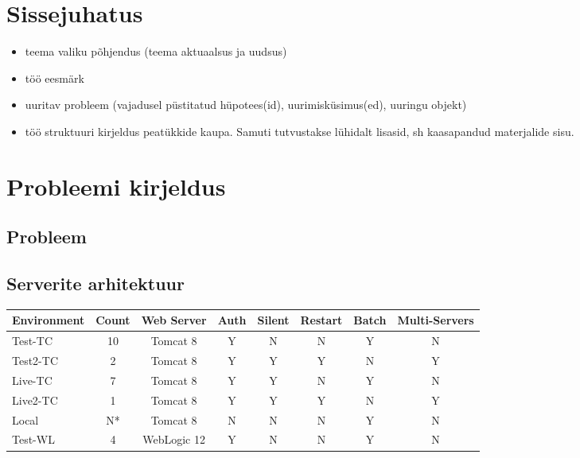 \documentclass[12pt]{report}
\renewcommand{\headrulewidth}{0pt}
\begin{document}
  \tableofcontents
  \fancypagestyle{plain}{%
    \renewcommand{\headrulewidth}{0pt}%
    \fancyhf{}%
    \fancyfoot[R]{\thepage}%
}
 
  \newpage
  
  \section*{Sissejuhatus}
  \label{sissejuhatus}
  
  \begin{itemize}
    \item teema valiku põhjendus (teema aktuaalsus ja uudsus)
    \item töö eesmärk
    \item  uuritav probleem (vajadusel püstitatud hüpotees(id), uurimisküsimus(ed), uuringu objekt)
    \item töö struktuuri kirjeldus peatükkide kaupa. Samuti tutvustakse lühidalt lisasid, sh kaasapandud
materjalide sisu.
  \end{itemize}
  
  \newpage
  
  \section{Probleemi kirjeldus}
  
  \subsection{Probleem}
  
  \subsection{Serverite arhitektuur}
  
  \begin{tabular}{|l|c|c|c|c|c|c|c|}
    \hline
    Environment & Count & Web Server & Auth & Silent & Restart & Batch & Multi-Servers\\
    \hline
    Test-TC & 10 & Tomcat 8 & Y & N & N & Y & N\\
    Test2-TC & 2 & Tomcat 8 & Y & Y & Y & N & Y\\
    Live-TC & 7 & Tomcat 8 & Y & Y & N & Y & N\\
    Live2-TC & 1 & Tomcat 8 & Y & Y & Y & N & Y\\
    Local & N* & Tomcat 8 & N & N & N & Y & N\\
    Test-WL & 4 & WebLogic 12 & Y & N & N & Y & N\\
    \hline
  \end{tabular}
\end{document}
